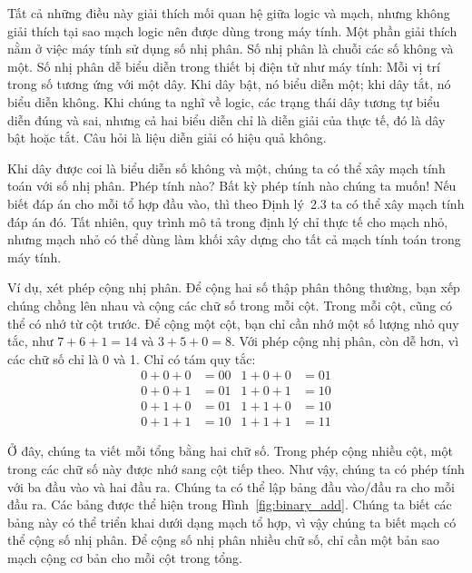 Tất cả những điều này giải thích mối quan hệ giữa logic và mạch, nhưng không giải thích tại sao mạch logic nên được dùng trong máy tính. Một phần giải thích nằm ở việc máy tính sử dụng số nhị phân. Số nhị phân là chuỗi các số không và một. Số nhị phân dễ biểu diễn trong thiết bị điện tử như máy tính: Mỗi vị trí trong số tương ứng với một dây. Khi dây bật, nó biểu diễn một; khi dây tắt, nó biểu diễn không. Khi chúng ta nghĩ về logic, các trạng thái dây tương tự biểu diễn đúng và sai, nhưng cả hai biểu diễn chỉ là diễn giải của thực tế, đó là dây bật hoặc tắt. Câu hỏi là liệu diễn giải có hiệu quả không.

Khi dây được coi là biểu diễn số không và một, chúng ta có thể xây mạch tính toán với số nhị phân. Phép tính nào? Bất kỳ phép tính nào chúng ta muốn! Nếu biết đáp án cho mỗi tổ hợp đầu vào, thì theo Định lý~2.3 ta có thể xây mạch tính đáp án đó. Tất nhiên, quy trình mô tả trong định lý chỉ thực tế cho mạch nhỏ, nhưng mạch nhỏ có thể dùng làm khối xây dựng cho tất cả mạch tính toán trong máy tính.

Ví dụ, xét phép cộng nhị phân. Để cộng hai số thập phân thông thường, bạn xếp chúng chồng lên nhau và cộng các chữ số trong mỗi cột. Trong mỗi cột, cũng có thể có nhớ từ cột trước. Để cộng một cột, bạn chỉ cần nhớ một số lượng nhỏ quy tắc, như $7 + 6 + 1 = 14$ và $3 + 5 + 0 = 8$. Với phép cộng nhị phân, còn dễ hơn, vì các chữ số chỉ là 0 và 1. Chỉ có tám quy tắc:
\begin{align*}
0 + 0 + 0 &= 00 & 1 + 0 + 0 &= 01 \\
0 + 0 + 1 &= 01 & 1 + 0 + 1 &= 10 \\
0 + 1 + 0 &= 01 & 1 + 1 + 0 &= 10 \\
0 + 1 + 1 &= 10 & 1 + 1 + 1 &= 11
\end{align*}

Ở đây, chúng ta viết mỗi tổng bằng hai chữ số. Trong phép cộng nhiều cột, một trong các chữ số này được nhớ sang cột tiếp theo. Như vậy, chúng ta có phép tính với ba đầu vào và hai đầu ra. Chúng ta có thể lập bảng đầu vào/đầu ra cho mỗi đầu ra. Các bảng được thể hiện trong Hình~\ref{fig:binary_add}. Chúng ta biết các bảng này có thể triển khai dưới dạng mạch tổ hợp, vì vậy chúng ta biết mạch có thể cộng số nhị phân. Để cộng số nhị phân nhiều chữ số, chỉ cần một bản sao mạch cộng cơ bản cho mỗi cột trong tổng.

